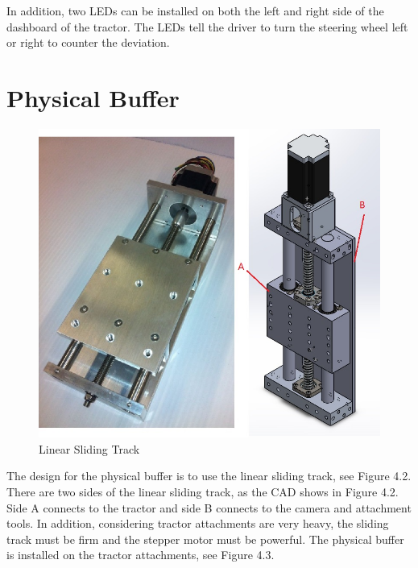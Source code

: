 In addition, two LEDs can be installed on both the left and right side of the dashboard of the tractor. The LEDs tell the driver to turn the steering wheel left or right to counter the deviation. 


\section{Physical Buffer}

\begin{figure}[ht!]
\begin{center}
\includegraphics[scale = 0.6]{pics/1D.jpg}
\caption{Linear Sliding Track}
\end{center}
\end{figure}
The design for the physical buffer is to use the linear sliding track, see Figure 4.2. There are two sides of the linear sliding track, as the CAD shows in Figure 4.2. Side A connects to the tractor and side B connects to the camera and attachment tools. In addition, considering tractor attachments are very heavy, the sliding track must be firm and the stepper motor must be powerful. The physical buffer is installed on the tractor attachments, see Figure 4.3.
